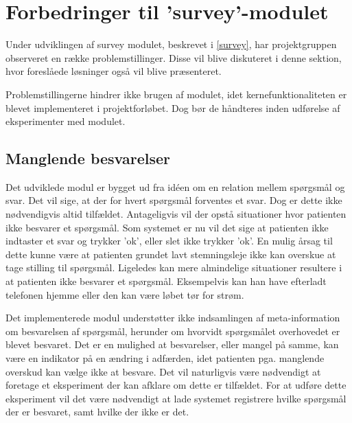 \label{refleksion}
\section{Forbedringer til 'survey'-modulet}
Under udviklingen af survey modulet, beskrevet i \cref{survey}, har projektgruppen observeret en række problemstillinger.
Disse vil blive diskuteret i denne sektion, hvor foreslåede løsninger også vil blive præsenteret.

Problemstillingerne hindrer ikke brugen af modulet, idet kernefunktionaliteten er blevet implementeret i projektforløbet.
Dog bør de håndteres inden udførelse af eksperimenter med modulet.

\subsection{Manglende besvarelser}\label{reflection:manglende}
Det udviklede modul er bygget ud fra idéen om en relation mellem spørgsmål og svar.
Det vil sige, at der for hvert spørgsmål forventes et svar.
Dog er dette ikke nødvendigvis altid tilfældet.
Antageligvis vil der opstå situationer hvor patienten ikke besvarer et spørgsmål.
Som systemet er nu vil det sige at patienten ikke indtaster et svar og trykker 'ok', eller slet ikke trykker 'ok'.
En mulig årsag til dette kunne være at patienten grundet lavt stemningsleje ikke kan overskue at tage stilling til spørgsmål.
Ligeledes kan mere almindelige situationer resultere i at patienten ikke besvarer et spørgsmål.
Eksempelvis kan han have efterladt telefonen hjemme eller den kan være løbet tør for strøm.

Det implementerede modul understøtter ikke indsamlingen af meta-information om besvarelsen af spørgsmål, herunder om hvorvidt spørgsmålet overhovedet er blevet besvaret.
Det er en mulighed at besvarelser, eller mangel på samme, kan være en indikator på en ændring i adfærden, idet patienten pga. manglende overskud kan vælge ikke at besvare.
Det vil naturligvis være nødvendigt at foretage et eksperiment der kan afklare om dette er tilfældet.
For at udføre dette eksperiment vil det være nødvendigt at lade systemet registrere hvilke spørgsmål der er besvaret, samt hvilke der ikke er det.

